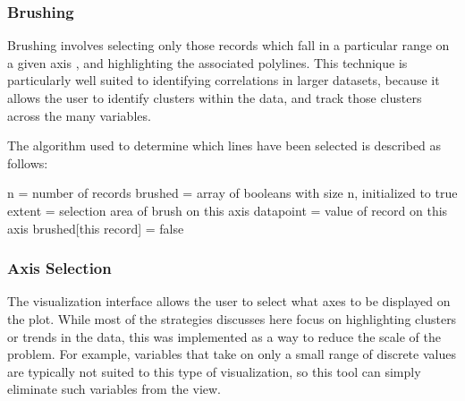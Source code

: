 \documentclass[]{article}
\begin{document}
		\subsubsection{Brushing}
			Brushing involves selecting only those records which fall in a particular range on a given axis \cite{bostock,kosara}, and highlighting the associated polylines. This technique is particularly well suited to identifying correlations in larger datasets, because it allows the user to identify clusters within the data, and track those clusters across the many variables.
			
			\par The algorithm used to determine which lines have been selected is described as follows:\\
			
			\begin{algorithm}[H]
				\SetAlgoLined
				
				n = number of records\;
				brushed = array of booleans with size n, initialized to true\;
				 {
					extent = selection area of brush on this axis\;
					 {
						datapoint = value of record on this axis\;
						 {
							brushed[this record] = false\;	
						}
					}
				}

			\end{algorithm}
			
		\subsubsection{Axis Selection}
		The visualization interface allows the user to select what axes to be displayed on the plot. While most of the strategies discusses here focus on highlighting clusters or trends in the data, this was implemented as a way to reduce the scale of the problem. For example, variables that take on only a small range of discrete values are typically not suited to this type of visualization\cite{kosara}, so this tool can simply eliminate such variables from the view.
		
\end{document}

